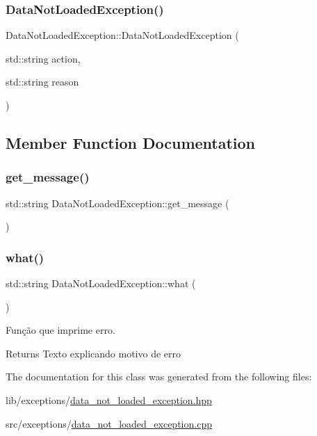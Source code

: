 \subsubsection{\texorpdfstring{Data\+Not\+Loaded\+Exception()}{DataNotLoadedException()}}
{\footnotesize\ttfamily Data\+Not\+Loaded\+Exception\+::\+Data\+Not\+Loaded\+Exception (\begin{DoxyParamCaption}\item[{std\+::string}]{action,  }\item[{std\+::string}]{reason }\end{DoxyParamCaption})}



\subsection{Member Function Documentation}
\mbox{\label{class_data_not_loaded_exception_a0582e704a9d3718bbcd7bce99c1756b6}} 
\subsubsection{\texorpdfstring{get\+\_\+message()}{get\_message()}}
{\footnotesize\ttfamily std\+::string Data\+Not\+Loaded\+Exception\+::get\+\_\+message (\begin{DoxyParamCaption}{ }\end{DoxyParamCaption})}

\mbox{\label{class_data_not_loaded_exception_aff68ebafb677711bd4be70865681fc50}} 
\subsubsection{\texorpdfstring{what()}{what()}}
{\footnotesize\ttfamily std\+::string Data\+Not\+Loaded\+Exception\+::what (\begin{DoxyParamCaption}{ }\end{DoxyParamCaption})}



Função que imprime erro. 

\begin{DoxyReturn}{Returns}
Texto explicando motivo de erro 
\end{DoxyReturn}


The documentation for this class was generated from the following files\+:\begin{DoxyCompactItemize}
\item 
lib/exceptions/\hyperlink{data__not__loaded__exception_8hpp}{data\+\_\+not\+\_\+loaded\+\_\+exception.\+hpp}\item 
src/exceptions/\hyperlink{data__not__loaded__exception_8cpp}{data\+\_\+not\+\_\+loaded\+\_\+exception.\+cpp}\end{DoxyCompactItemize}

